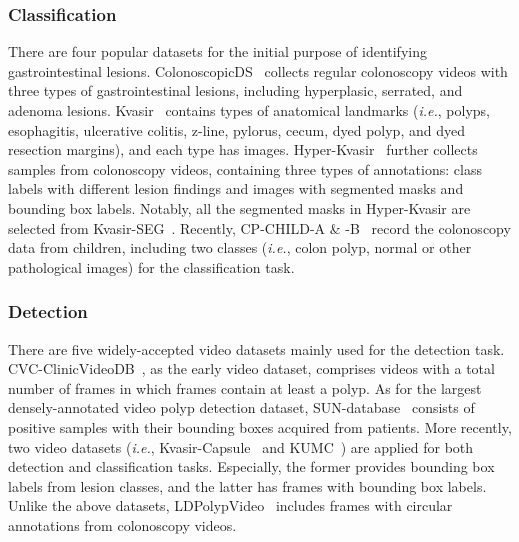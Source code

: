 \documentclass[default,iicol]{sn-jnl}
\theoremstyle{thmstyleone}
\theoremstyle{thmstyletwo}
\theoremstyle{thmstylethree}
\def\ie{\emph{i.e.}}
\begin{document}
\subsubsection{Classification}
There are four popular datasets for the initial purpose of identifying gastrointestinal lesions.
ColonoscopicDS~\cite{mesejo2016computer} collects  regular colonoscopy videos with three types of gastrointestinal lesions, including hyperplasic, serrated, and adenoma lesions.
Kvasir~\cite{pogorelov2017kvasir} contains  types of anatomical landmarks (\ie, polyps, esophagitis, ulcerative colitis, z-line, pylorus, cecum, dyed polyp, and dyed resection margins), and each type has  images.
Hyper-Kvasir~\cite{borgli2020hyperkvasir} further collects  samples from  colonoscopy videos, containing three types of annotations:  class labels with  different lesion findings and  images with segmented masks and bounding box labels.
Notably, all the segmented masks in Hyper-Kvasir are selected from Kvasir-SEG~\cite{borgli2020hyperkvasir}.
Recently, CP-CHILD-A \& -B~\cite{wang2020improved} record the colonoscopy data from children, including two classes (\ie, colon polyp, normal or other pathological images) for the classification task.

\subsubsection{Detection}
There are five widely-accepted video datasets mainly used for the detection task.
CVC-ClinicVideoDB~\cite{giana2017}, as the early video dataset, comprises  videos with a total number of  frames in which  frames contain at least a polyp.
As for the largest densely-annotated video polyp detection dataset, SUN-database~\cite{misawa2020development} consists of  positive samples with their bounding boxes acquired from  patients.
More recently, two video datasets (\ie, Kvasir-Capsule~\cite{smedsrud2021kvasir} and KUMC~\cite{li2021colonoscopy}) are applied for both detection and classification tasks.
Especially, the former provides  bounding box labels from  lesion classes, and the latter has  frames with bounding box labels.
Unlike the above datasets, LDPolypVideo~\cite{ma2021ldpolypvideo} includes  frames with circular annotations from  colonoscopy videos.
\end{document}
